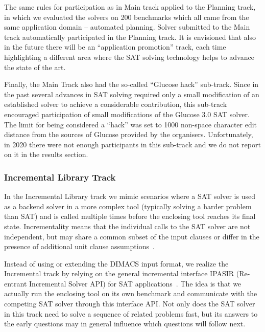 \documentclass{elsarticle}
\begin{document}
The same rules for participation as in Main track applied to the Planning track, in which we evaluated the solvers on 200 benchmarks 
which all came from the same application domain -- automated planning. 
Solver submitted to the Main track automatically participated in the Planning track.
It is envisioned that also in the future there will be an ``application promotion'' track,
each time highlighting a different area where the SAT solving technology helps to advance the state of the art.

Finally, the Main Track also had the so-called ``Glucose hack'' sub-track. 
Since in the past several advances in SAT solving required only a small modification of an established solver
to achieve a considerable contribution, this sub-track encouraged participation 
of small modifications of the Glucose 3.0 SAT solver. The limit for being considered a ``hack''
was set to 1000 non-space character edit distance from the sources of Glucose provided by the organisers. 
Unfortunately, in 2020 there were not enough participants in this sub-track and we do not report on it 
in the results section.

\subsubsection{Incremental Library Track}

In the Incremental Library track we mimic scenarios
where a SAT solver is used as a backend solver in a more complex tool
(typically solving a harder problem than SAT) and is called multiple times before 
the enclosing tool reaches its final state. Incrementality means that
the individual calls to the SAT solver are not independent, but may share 
a common subset of the input clauses or differ in the presence of additional 
unit clause assumptions~\cite{Nadel:2014:Incremental,Fazekas:2019:IncrementalInprocessing}. 

Instead of using or extending the DIMACS input format, we realize the Incremental track
by relying on the general incremental interface IPASIR (Re-entrant Incremental Solver API) 
for SAT applications~\cite{Balyo:2015:SATRace}. The idea is that we actually run the 
enclosing tool on its own benchmark and communicate with the competing SAT solver 
through this interface API. Not only does the SAT solver in this track
need to solve a sequence of related problems fast, but its answers to the early questions
may in general influence which questions will follow next.
\end{document}
